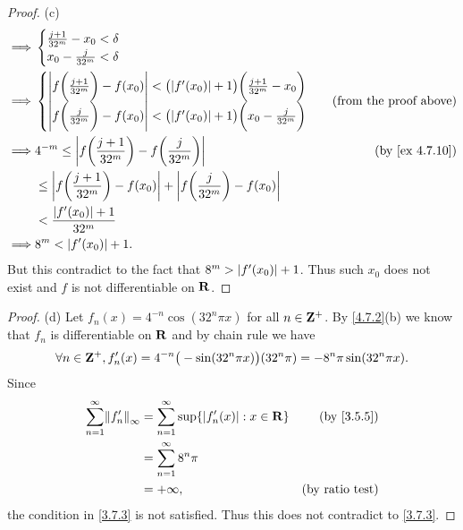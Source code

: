 \begin{proof}{(c)}
\begin{align*}
    \implies & \begin{cases}
                 \frac{j + 1}{32^m} - x_0 < \delta \\
                 x_0 - \frac{j}{32^m} < \delta
               \end{cases}                                                                                                                        \\
    \implies & \begin{cases}
                 \abs{f\bigg(\frac{j + 1}{32^m}\bigg) - f(x_0)} < \big(\abs{f'(x_0)} + 1\big) \bigg(\frac{j + 1}{32^m} - x_0\bigg) \\
                 \abs{f\bigg(\frac{j}{32^m}\bigg) - f(x_0)} < \big(\abs{f'(x_0)} + 1\big) \bigg(x_0 - \frac{j}{32^m}\bigg)
               \end{cases} & \text{(from the proof above)}                                   \\
    \implies & 4^{-m} \leq \abs{f\bigg(\frac{j + 1}{32^m}\bigg) - f\bigg(\frac{j}{32^m}\bigg)}                                           & \text{(by \cref{ex 4.7.10})} \\
             & \leq \abs{f\bigg(\frac{j + 1}{32^m}\bigg) - f(x_0)} + \abs{f\bigg(\frac{j}{32^m}\bigg) - f(x_0)}                                                         \\
             & < \frac{\abs{f'(x_0)} + 1}{32^m}                                                                                                                         \\
    \implies & 8^m < \abs{f'(x_0)} + 1.
  \end{align*}
  But this contradict to the fact that \(8^m > \left\lvert f'(x_0)\right\rvert + 1\).
  Thus such \(x_0\) does not exist and \(f\) is not differentiable on \(\mathbf{R}\).
\end{proof}

\begin{proof}{(d)}
  Let \(f_n(x) = 4^{-n} \cos(32^n \pi x)\) for all \(n \in \mathbf{Z}^+\).
  By \cref{4.7.2}(b) we know that \(f_n\) is differentiable on \(\mathbf{R}\) and by chain rule we have
  \[
    \forall n \in \mathbf{Z}^+, f_n'(x) = 4^{-n} \big(-\sin(32^n \pi x)\big) (32^n \pi) = - 8^n \pi \sin(32^n \pi x).
  \]
  Since
  \begin{align*}
    \sum_{n = 1}^\infty \norm*{f_n'}_\infty & = \sum_{n = 1}^\infty \sup\{\abs{f_n'(x)} : x \in \R\} & \text{(by \cref{3.5.5})} \\
                                            & = \sum_{n = 1}^\infty 8^n \pi                                                     \\
                                            & = +\infty,                                             & \text{(by ratio test)}
  \end{align*}
  the condition in \cref{3.7.3} is not satisfied.
  Thus this does not contradict to \cref{3.7.3}.
\end{proof}